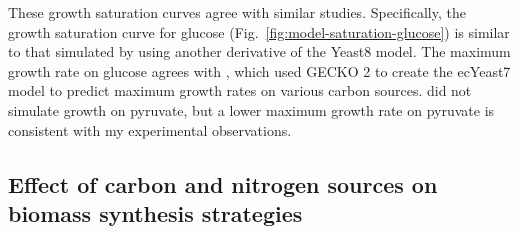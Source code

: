 These growth saturation curves agree with similar studies.
Specifically, the growth saturation curve for glucose (Fig.\ \ref{fig:model-saturation-glucose}) is similar to that simulated by \textcite{elsemmanWholecellModelingYeast2022} using another derivative of the Yeast8 model.
The maximum growth rate on glucose agrees with \textcite{domenzainReconstructionCatalogueGenomescale2022}, which used GECKO 2 to create the ecYeast7 model to predict maximum growth rates on various carbon sources.
\textcite{domenzainReconstructionCatalogueGenomescale2022} did not simulate growth on pyruvate, but a lower maximum growth rate on pyruvate is consistent with my experimental observations.


\subsection{Effect of carbon and nitrogen sources on biomass synthesis strategies}
\label{subsec:model-grid}

